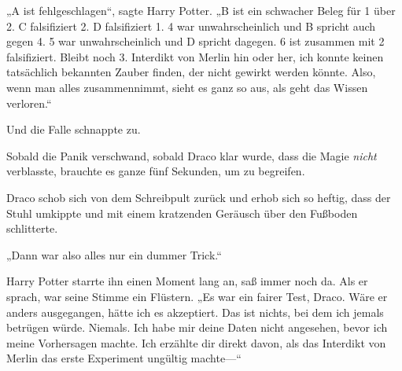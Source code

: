 „A ist fehlgeschlagen“, sagte Harry Potter. „B ist ein schwacher Beleg für 1 über 2. C falsifiziert 2. D falsifiziert 1. 4 war unwahrscheinlich und B spricht auch gegen 4. 5 war unwahrscheinlich und D spricht dagegen. 6 ist zusammen mit 2 falsifiziert. Bleibt noch 3. Interdikt von Merlin hin oder her, ich konnte keinen tatsächlich bekannten Zauber finden, der nicht gewirkt werden könnte. Also, wenn man alles zusammennimmt, sieht es ganz so aus, als geht das Wissen verloren.“

Und die Falle schnappte zu.

Sobald die Panik verschwand, sobald Draco klar wurde, dass die Magie \emph{nicht} verblasste, brauchte es ganze fünf Sekunden, um zu begreifen.

Draco schob sich von dem Schreibpult zurück und erhob sich so heftig, dass der Stuhl umkippte und mit einem kratzenden Geräusch über den Fußboden schlitterte.

„Dann war also alles nur ein dummer Trick.“

Harry Potter starrte ihn einen Moment lang an, saß immer noch da. Als er sprach, war seine Stimme ein Flüstern. „Es war ein fairer Test, Draco. Wäre er anders ausgegangen, hätte ich es akzeptiert. Das ist nichts, bei dem ich jemals betrügen würde. Niemals. Ich habe mir deine Daten nicht angesehen, bevor ich meine Vorhersagen machte. Ich erzählte dir direkt davon, als das Interdikt von Merlin das erste Experiment ungültig machte—“

